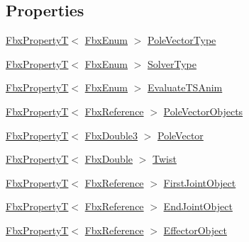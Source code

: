 \subsection*{Properties}
\begin{DoxyCompactItemize}
\item 
\hyperlink{class_fbx_property_t}{Fbx\+PropertyT}$<$ \hyperlink{fbxtypes_8h_a9a28614cb4272a0ad7d748eda7f3d3e5}{Fbx\+Enum} $>$ \hyperlink{class_fbx_constraint_single_chain_i_k_a5005bf5aa9d33200a228ad9723c519b0}{Pole\+Vector\+Type}
\item 
\hyperlink{class_fbx_property_t}{Fbx\+PropertyT}$<$ \hyperlink{fbxtypes_8h_a9a28614cb4272a0ad7d748eda7f3d3e5}{Fbx\+Enum} $>$ \hyperlink{class_fbx_constraint_single_chain_i_k_a2ed14960ba042a0c7f447306560bbe11}{Solver\+Type}
\item 
\hyperlink{class_fbx_property_t}{Fbx\+PropertyT}$<$ \hyperlink{fbxtypes_8h_a9a28614cb4272a0ad7d748eda7f3d3e5}{Fbx\+Enum} $>$ \hyperlink{class_fbx_constraint_single_chain_i_k_ae2f5d57a658c12c748ceeccd31809a3f}{Evaluate\+T\+S\+Anim}
\item 
\hyperlink{class_fbx_property_t}{Fbx\+PropertyT}$<$ \hyperlink{fbxtypes_8h_a44df6a2eec915cf27cd481e5c5e48a24}{Fbx\+Reference} $>$ \hyperlink{class_fbx_constraint_single_chain_i_k_a20b0f346f5d104fd63a69e3b560cfaba}{Pole\+Vector\+Objects}
\item 
\hyperlink{class_fbx_property_t}{Fbx\+PropertyT}$<$ \hyperlink{fbxtypes_8h_ae0a96f14cde566774c7553aa7523b7a7}{Fbx\+Double3} $>$ \hyperlink{class_fbx_constraint_single_chain_i_k_a0fb576e54a64caab8e6609060e020ae2}{Pole\+Vector}
\item 
\hyperlink{class_fbx_property_t}{Fbx\+PropertyT}$<$ \hyperlink{fbxtypes_8h_a171e72a1c46fc15c1a6c9c31948c1c5b}{Fbx\+Double} $>$ \hyperlink{class_fbx_constraint_single_chain_i_k_a3756b61ba9a55d15c00229fc9a670e4e}{Twist}
\item 
\hyperlink{class_fbx_property_t}{Fbx\+PropertyT}$<$ \hyperlink{fbxtypes_8h_a44df6a2eec915cf27cd481e5c5e48a24}{Fbx\+Reference} $>$ \hyperlink{class_fbx_constraint_single_chain_i_k_ad33341677c0cf0689bcbc1f4e4eda23a}{First\+Joint\+Object}
\item 
\hyperlink{class_fbx_property_t}{Fbx\+PropertyT}$<$ \hyperlink{fbxtypes_8h_a44df6a2eec915cf27cd481e5c5e48a24}{Fbx\+Reference} $>$ \hyperlink{class_fbx_constraint_single_chain_i_k_acb671de7c974cc53fba45d34dcdf9db4}{End\+Joint\+Object}
\item 
\hyperlink{class_fbx_property_t}{Fbx\+PropertyT}$<$ \hyperlink{fbxtypes_8h_a44df6a2eec915cf27cd481e5c5e48a24}{Fbx\+Reference} $>$ \hyperlink{class_fbx_constraint_single_chain_i_k_ab7b3721f2b7f267b6dd35ce38ffa7bbe}{Effector\+Object}
\end{DoxyCompactItemize}
